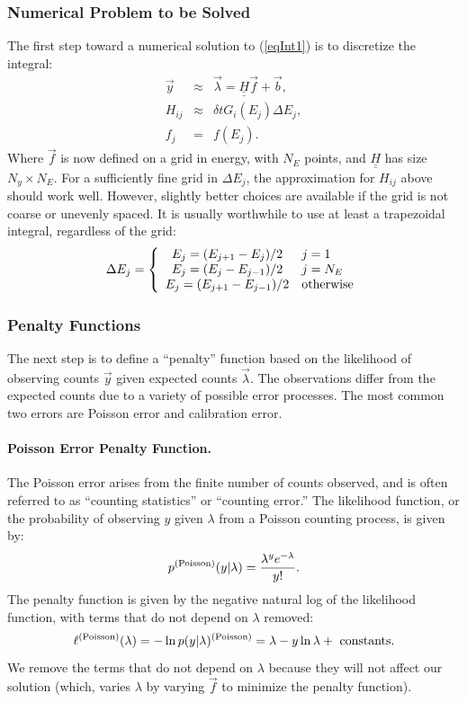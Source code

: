 \documentclass{article}    %
\newcommand{\dbul}[1]{\underline{\underline{#1}}}
\newcommand{\subsubsubsection}[1]{\paragraph{#1.}}
\begin{document}
\subsubsection{Numerical Problem to be Solved}

The first step toward a numerical solution to (\ref{eqInt1}) is to discretize the integral:
\begin{eqnarray}
\vec{y} &\approx& \vec{\lambda} = \dbul{H}\vec{f} + \vec{b}, \\
H_{ij} &\approx& \delta t G_i(E_j) \Delta E_j, \\
f_j &=& f(E_j).
\end{eqnarray}
Where $\vec{f}$ is now defined on a grid in energy, with $N_E$ points,
and $\dbul{H}$ has size $N_y \times N_E$. For a sufficiently fine grid
in $\Delta E_j$, the approximation for $H_{ij}$ above should work
well. However, slightly better choices are available if the grid
is not coarse or unevenly spaced. It is usually worthwhile to use
at least a trapezoidal integral, regardless of the grid:
\begin{equation}
  \Delta E_j = \left\{
\begin{array}{cl}
E_j = (E_{j+1}-E_j)/2 & j=1 \\
E_j = (E_{j}-E_{j-1})/2 & j=N_E \\
E_j = (E_{j+1}-E_{j-1})/2 & {\rm otherwise}
\end{array}
\right.
\end{equation}

\subsubsection{Penalty Functions}

The next step is to define a ``penalty'' function based on the
likelihood of observing counts $\vec{y}$ given expected counts
$\vec{\lambda}$. The observations differ from the expected counts due
to a variety of possible error processes. The most common two errors
are Poisson error and calibration error. 

\subsubsubsection{Poisson Error Penalty Function}

The Poisson error arises from the finite number of counts observed,
and is often referred to as ``counting statistics'' or ``counting
error.'' The likelihood function, or the probability of observing $y$
given $\lambda$ from a Poisson counting process, is given by:
\begin{equation}
p^{\rm (Poisson)}(y|\lambda) = \frac{\lambda^y e^{-\lambda}}{y!}.
\end{equation}
The penalty function is given by the negative natural log of the
likelihood function, with terms that do not depend on $\lambda$ removed:
\begin{equation}
\ell^{\rm (Poisson)}(\lambda) = -\ln p(y|\lambda)^{\rm (Poisson)} = \lambda-y\ln\lambda + {\rm ~ constants}.
\end{equation}
We remove the terms that do not depend on $\lambda$ because they will
not affect our solution (which, varies $\lambda$ by varying $\vec{f}$
to minimize the penalty function).
\end{document}
